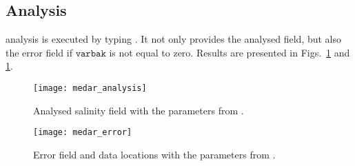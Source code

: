 \subsection{Analysis}

\diva analysis is executed by typing . It not only provides the analysed field, but also the error field if $\texttt{varbak}$ is not equal to zero. Results are presented in Figs.~\ref{analysisCL1} and \ref{analysisCL1}.

\begin{figure}[htpb]
\centering
\texttt{[image: medar\_analysis]}
\caption{Analysed salinity field with the parameters from .\label{analysisCL1}}
\end{figure}


\begin{figure}[htpb]
\centering
\texttt{[image: medar\_error]}
\caption{Error field and data locations with the parameters from .\label{errorCL1}}
\end{figure}



\clearpage
%




%
%



